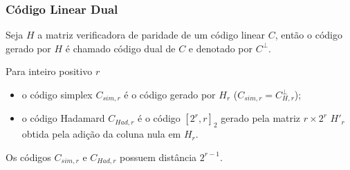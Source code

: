 \begin{frame}
  \frametitle{Código Linear Dual}
  Seja $H$ a matriz verificadora de paridade de um código linear $C$, então o código gerado por $H$ é chamado código dual de $C$ e denotado por $C^\perp$.

  \vspace{3ex}
  Para inteiro positivo $r$ 
  \begin{itemize}  
    \item o código simplex $C_{sim,r}$ é o código gerado por $H_r$ ($C_{sim,r} = C_{H,r}^\perp$);
    \item o código Hadamard $C_{Had,r}$ é o código $[2^r,r]_2$ gerado pela matriz $r \times 2^r$ $H'_r$ obtida pela adição da coluna nula em $H_r$.
  \end{itemize}

  Os códigos $C_{sim,r}$ e $C_{Had,r}$ possuem distância $2^{r-1}$.
\end{frame}


